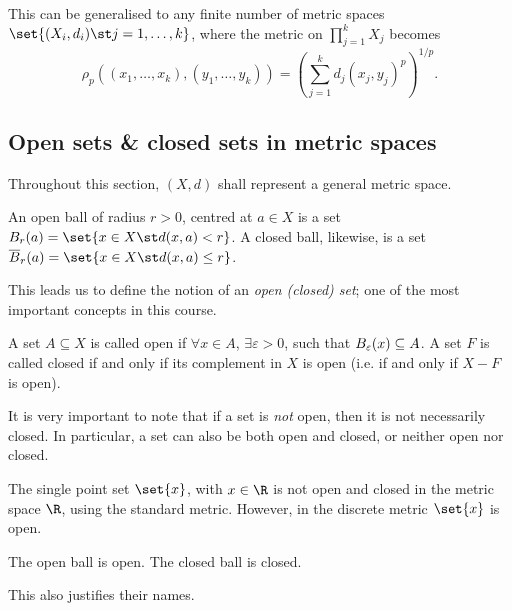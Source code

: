 This can be generalised to any finite number of metric spaces $\set{(X_i, d_i) \st j=1,\dots,k}$, where the metric on $\prod_{j=1}^{k} X_j$ becomes
\begin{equation*}
  \rho_{p}((x_1,\dots,x_k), (y_1,\dots,y_k))
  = \left(\sum_{j=1}^{k} d_{j}(x_j, y_j)^{p}\right)^{1/p}.
\end{equation*}


\subsection{Open sets \& closed sets in metric spaces}
Throughout this section, $(X,d)$ shall represent a general metric space.

\begin{ndfn}
  An open ball of radius $r>0$, centred at $a \in X$ is a set $\oB_{r}(a) = \set{x \in X \st d(x,a) < r}$. A closed ball, likewise, is a set $\cB_{r}(a) = \set{x \in X \st d(x,a) \leq r}$.
\end{ndfn}
This leads us to define the notion of an \emph{open (closed) set}; one of the most important concepts in this course.

\begin{ndfn}
  A set $A \subseteq X$ is called open if $\forall x \in A$, $\exists \varepsilon > 0$, such that $B_{\varepsilon}(x) \subseteq A$. A set $F$ is called closed if and only if its complement in $X$ is open (i.e. if and only if $X-F$ is open).
\end{ndfn}
It is very important to note that if a set is \emph{not} open, then it is not necessarily closed. In particular, a set can also be both open and closed, or neither open nor closed.


\begin{negg}
  The single point set $\set{x}$, with $x\in\R$ is not open and closed in the metric space $\R$, using the standard metric. However, in the discrete metric $\set{x}$ is open.\eggqed
\end{negg}


\begin{nlemma}
  The open ball is open. The closed ball is closed.
\end{nlemma}
This also justifies their names.

